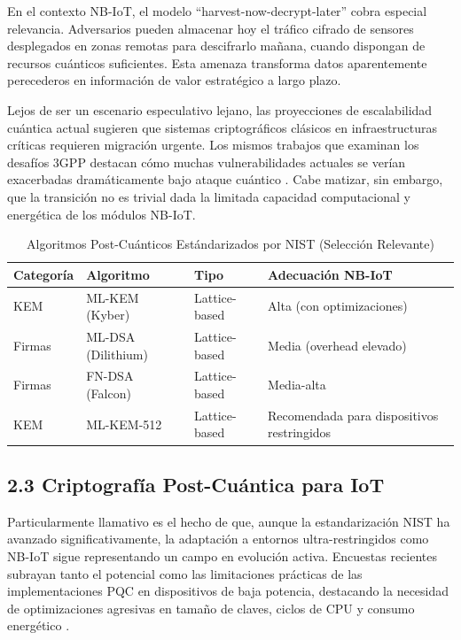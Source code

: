 En el contexto NB-IoT, el modelo ``harvest-now-decrypt-later'' cobra especial relevancia. Adversarios pueden almacenar hoy el tráfico cifrado de sensores desplegados en zonas remotas para descifrarlo mañana, cuando dispongan de recursos cuánticos suficientes. Esta amenaza transforma datos aparentemente perecederos en información de valor estratégico a largo plazo.

Lejos de ser un escenario especulativo lejano, las proyecciones de escalabilidad cuántica actual sugieren que sistemas criptográficos clásicos en infraestructuras críticas requieren migración urgente. Los mismos trabajos que examinan los desafíos 3GPP destacan cómo muchas vulnerabilidades actuales se verían exacerbadas dramáticamente bajo ataque cuántico \cite{Althobaiti2020_Cybersecurity}. Cabe matizar, sin embargo, que la transición no es trivial dada la limitada capacidad computacional y energética de los módulos NB-IoT.

\begin{table}[t]
\centering
\caption{Algoritmos Post-Cuánticos Estándarizados por NIST (Selección Relevante)}
\label{tab:pqc_nist}
\begin{tabular}{|l|l|l|l|}
\hline
\textbf{Categoría} & \textbf{Algoritmo} & \textbf{Tipo} & \textbf{Adecuación NB-IoT} \\
\hline
KEM & ML-KEM (Kyber) & Lattice-based & Alta (con optimizaciones) \\
\hline
Firmas & ML-DSA (Dilithium) & Lattice-based & Media (overhead elevado) \\
\hline
Firmas & FN-DSA (Falcon) & Lattice-based & Media-alta \\
\hline
KEM & ML-KEM-512 & Lattice-based & Recomendada para dispositivos restringidos \\
\hline
\end{tabular}
\end{table}

\subsection{2.3 Criptografía Post-Cuántica para IoT}

Particularmente llamativo es el hecho de que, aunque la estandarización NIST ha avanzado significativamente, la adaptación a entornos ultra-restringidos como NB-IoT sigue representando un campo en evolución activa. Encuestas recientes subrayan tanto el potencial como las limitaciones prácticas de las implementaciones PQC en dispositivos de baja potencia, destacando la necesidad de optimizaciones agresivas en tamaño de claves, ciclos de CPU y consumo energético \cite{Liu2024_PQC_IoT}.

